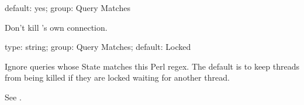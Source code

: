 \documentclass[letterpaper,10pt,english]{sphinxmanual}
\begin{document}
\begin{fulllineitems}
\label{\detokenize{mariadb-kill:cmdoption-mariadb-kill-no-ignore-self}}
\sphinxAtStartPar
default: yes; group: Query Matches

\sphinxAtStartPar
Don’t kill ’s own connection.

\end{fulllineitems}


\begin{fulllineitems}
\label{\detokenize{mariadb-kill:cmdoption-mariadb-kill-ignore-state}}
\sphinxAtStartPar
type: string; group: Query Matches; default: Locked

\sphinxAtStartPar
Ignore queries whose State matches this Perl regex.  The default is to keep
threads from being killed if they are locked waiting for another thread.

\sphinxAtStartPar
See {\hyperref[\detokenize{mariadb-kill:cmdoption-mariadb-kill-match-state}]{}}.

\end{fulllineitems}

\end{document}
